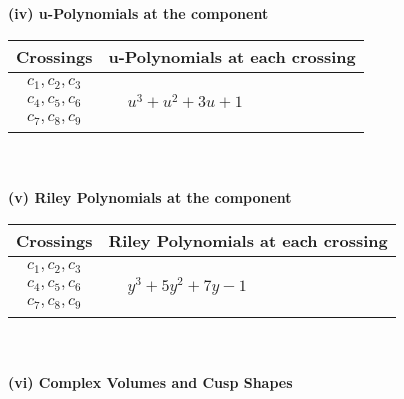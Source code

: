 \documentclass[1p]{elsarticle_modified}
\theoremstyle{definition}
\begin{document}
\newpage\renewcommand{\arraystretch}{1}
\flushleft \textbf{(iv) u-Polynomials at the component}\newline \\
\begin{tabular}{m{50pt}|m{274pt}}
Crossings & \hspace{64pt}u-Polynomials at each crossing \\
\hline $$\begin{aligned}c_{1},c_{2},c_{3}\\c_{4},c_{5},c_{6}\\c_{7},c_{8},c_{9}\end{aligned}$$&$\begin{aligned}
&u^3+u^2+3 u+1
\end{aligned}$\\
\hline
\end{tabular}\\~\\
\newpage\renewcommand{\arraystretch}{1}
\flushleft \textbf{(v) Riley Polynomials at the component}\newline \\
\begin{tabular}{m{50pt}|m{274pt}}
Crossings & \hspace{64pt}Riley Polynomials at each crossing \\
\hline $$\begin{aligned}c_{1},c_{2},c_{3}\\c_{4},c_{5},c_{6}\\c_{7},c_{8},c_{9}\end{aligned}$$&$\begin{aligned}
&y^3+5 y^2+7 y-1
\end{aligned}$\\
\hline
\end{tabular}\\~\\
\newpage\flushleft \textbf{(vi) Complex Volumes and Cusp Shapes}
\end{document}
